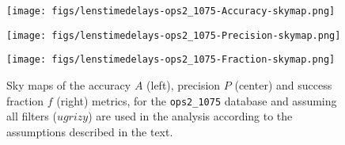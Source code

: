 \begin{figure*}[!ht]
  \capstart
  \begin{minipage}[b]{\linewidth}
    \begin{minipage}[b]{0.32\linewidth}
      \centering\texttt{[image: figs/lenstimedelays-ops2\_1075-Accuracy-skymap.png]}
    \end{minipage} \hfill
    \begin{minipage}[b]{0.32\linewidth}
      \centering\texttt{[image: figs/lenstimedelays-ops2\_1075-Precision-skymap.png]}
    \end{minipage} \hfill
    \begin{minipage}[b]{0.32\linewidth}
      \centering\texttt{[image: figs/lenstimedelays-ops2\_1075-Fraction-skymap.png]}
    \end{minipage}
  \end{minipage}
\caption{Sky maps of the accuracy $A$ (left), precision $P$ (center) and
success fraction $f$ (right) metrics, for the \texttt{ops2\_1075} \OpSim
database and assuming all filters ($ugrizy$) are used in the analysis
according to the assumptions described in the text.}
\label{fig:lenstimedelays:results}
\end{figure*}


